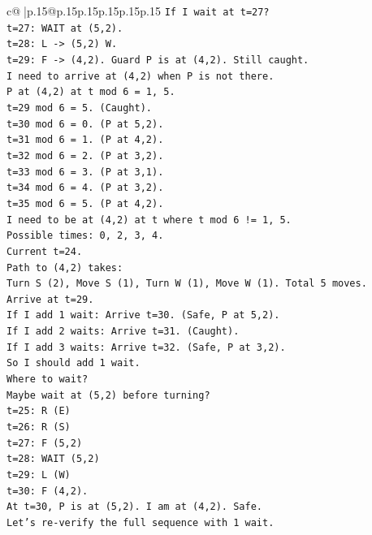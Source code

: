 \documentclass{article}
\begin{document}
{\begin{supertabular}{c@{$\;$}|p{.15\linewidth}@{}p{.15\linewidth}p{.15\linewidth}p{.15\linewidth}p{.15\linewidth}p{.15\linewidth}}
{{{\texttt{If I wait at t=27?} \\
\texttt{t=27: WAIT at (5,2).} \\
\texttt{t=28: L {-}> (5,2) W.} \\
\texttt{t=29: F {-}> (4,2). Guard P is at (4,2). Still caught.} \\
\texttt{I need to arrive at (4,2) when P is not there.} \\
\texttt{P at (4,2) at t mod 6 = 1, 5.} \\
\texttt{t=29 mod 6 = 5. (Caught).} \\
\texttt{t=30 mod 6 = 0. (P at 5,2).} \\
\texttt{t=31 mod 6 = 1. (P at 4,2).} \\
\texttt{t=32 mod 6 = 2. (P at 3,2).} \\
\texttt{t=33 mod 6 = 3. (P at 3,1).} \\
\texttt{t=34 mod 6 = 4. (P at 3,2).} \\
\texttt{t=35 mod 6 = 5. (P at 4,2).} \\
\texttt{I need to be at (4,2) at t where t mod 6 != 1, 5.} \\
\texttt{Possible times: 0, 2, 3, 4.} \\
\texttt{Current t=24.} \\
\texttt{Path to (4,2) takes:} \\
\texttt{Turn S (2), Move S (1), Turn W (1), Move W (1). Total 5 moves.} \\
\texttt{Arrive at t=29.} \\
\texttt{If I add 1 wait: Arrive t=30. (Safe, P at 5,2).} \\
\texttt{If I add 2 waits: Arrive t=31. (Caught).} \\
\texttt{If I add 3 waits: Arrive t=32. (Safe, P at 3,2).} \\
\texttt{So I should add 1 wait.} \\
\texttt{Where to wait?} \\
\texttt{Maybe wait at (5,2) before turning?} \\
\texttt{t=25: R (E)} \\
\texttt{t=26: R (S)} \\
\texttt{t=27: F (5,2)} \\
\texttt{t=28: WAIT (5,2)} \\
\texttt{t=29: L (W)} \\
\texttt{t=30: F (4,2).} \\
\texttt{At t=30, P is at (5,2). I am at (4,2). Safe.} \\
\texttt{Let's re{-}verify the full sequence with 1 wait.} \\
}}}
\end{supertabular}}
\end{document}

